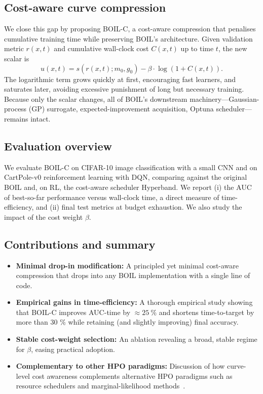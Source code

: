 \documentclass{article} %
\begin{document}
\subsection{Cost-aware curve compression}
We close this gap by proposing BOIL-C, a cost-aware compression that penalises cumulative training time while preserving BOIL's architecture. Given validation metric \(r(x,t)\) and cumulative wall-clock cost \(C(x,t)\) up to time \(t\), the new scalar is
\[
 u(x,t)=s(r(x,t);m_0,g_0)-\beta\cdot\log(1+C(x,t)).
\]
The logarithmic term grows quickly at first, encouraging fast learners, and saturates later, avoiding excessive punishment of long but necessary training. Because only the scalar changes, all of BOIL's downstream machinery—Gaussian-process (GP) surrogate, expected-improvement acquisition, Optuna scheduler—remains intact.

\subsection{Evaluation overview}
We evaluate BOIL-C on CIFAR-10 image classification with a small CNN and on CartPole-v0 reinforcement learning with DQN, comparing against the original BOIL and, on RL, the cost-aware scheduler Hyperband. We report (i) the AUC of best-so-far performance versus wall-clock time, a direct measure of time-efficiency, and (ii) final test metrics at budget exhaustion. We also study the impact of the cost weight \(\beta\).

\subsection{Contributions and summary}
\begin{itemize}
  \item \textbf{Minimal drop-in modification:} A principled yet minimal cost-aware compression that drops into any BOIL implementation with a single line of code.
  \item \textbf{Empirical gains in time-efficiency:} A thorough empirical study showing that BOIL-C improves AUC-time by \(\approx 25\ \%\) and shortens time-to-target by more than 30 \% while retaining (and slightly improving) final accuracy.
  \item \textbf{Stable cost-weight selection:} An ablation revealing a broad, stable regime for \(\beta\), easing practical adoption.
  \item \textbf{Complementary to other HPO paradigms:} Discussion of how curve-level cost awareness complements alternative HPO paradigms such as resource schedulers and marginal-likelihood methods~\cite{mlodozeniec-2023-hyperparameter}.
\end{itemize}
\end{document}
